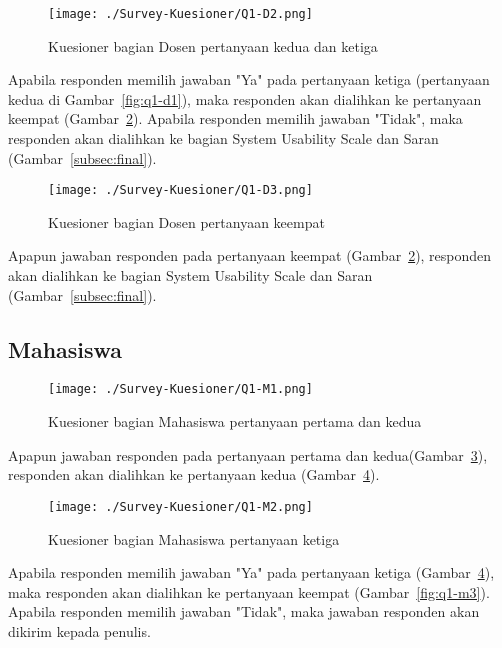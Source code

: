 \begin{figure}[H]
	\centering  
	\texttt{[image: ./Survey-Kuesioner/Q1-D2.png]}  
	\caption[Kuesioner bagian Dosen pertanyaan kedua dan ketiga]{Kuesioner bagian Dosen pertanyaan kedua dan ketiga} 
	\label{fig:q1-d2} 
\end{figure}

Apabila responden memilih jawaban "Ya" pada pertanyaan ketiga (pertanyaan kedua di Gambar~\ref{fig:q1-d1}), maka responden akan dialihkan ke pertanyaan keempat (Gambar~\ref{fig:q1-d3}). Apabila responden memilih jawaban "Tidak", maka responden akan dialihkan ke bagian System Usability Scale dan Saran (Gambar~\ref{subsec:final}). 

\begin{figure}[H]
	\centering  
	\texttt{[image: ./Survey-Kuesioner/Q1-D3.png]}  
	\caption[Kuesioner bagian Dosen pertanyaan keempat]{Kuesioner bagian Dosen pertanyaan keempat} 
	\label{fig:q1-d3} 
\end{figure}

Apapun jawaban responden pada pertanyaan keempat (Gambar~\ref{fig:q1-d3}), responden akan dialihkan ke bagian System Usability Scale dan Saran (Gambar~\ref{subsec:final}).

\subsection{Mahasiswa}
\label{subsec:survey-mahasiswa}
\begin{figure}[H]
	\centering  
	\texttt{[image: ./Survey-Kuesioner/Q1-M1.png]}  
	\caption[Kuesioner bagian Mahasiswa pertanyaan pertama dan kedua]{Kuesioner bagian Mahasiswa pertanyaan pertama dan kedua} 
	\label{fig:q1-m1} 
\end{figure}

Apapun jawaban responden pada pertanyaan pertama dan kedua(Gambar~\ref{fig:q1-m1}), responden akan dialihkan ke pertanyaan kedua (Gambar~\ref{fig:q1-m2}).

\begin{figure}[H]
	\centering  
	\texttt{[image: ./Survey-Kuesioner/Q1-M2.png]}  
	\caption[Kuesioner bagian Mahasiswa pertanyaan ketiga]{Kuesioner bagian Mahasiswa pertanyaan ketiga} 
	\label{fig:q1-m2} 
\end{figure}

Apabila responden memilih jawaban "Ya" pada pertanyaan ketiga (Gambar~\ref{fig:q1-m2}), maka responden akan dialihkan ke pertanyaan keempat (Gambar~\ref{fig:q1-m3}). Apabila responden memilih jawaban "Tidak", maka jawaban responden akan dikirim kepada penulis.

